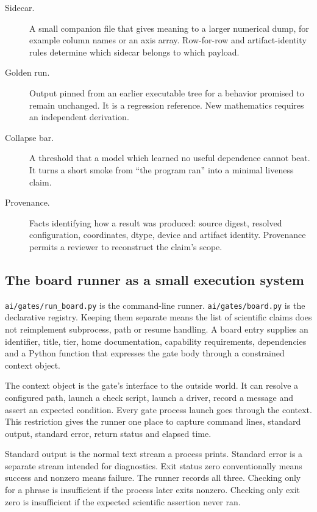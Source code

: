 \documentclass[10pt,aps,prd,twocolumn,nofootinbib]{revtex4-2}
\newcommand{\code}[1]{\texttt{#1}}
\begin{document}
\begin{description}
  \item[Sidecar.] A small companion file that gives meaning to a larger
  numerical dump, for example column names or an axis array.  Row-for-row and
  artifact-identity rules determine which sidecar belongs to which payload.

  \item[Golden run.] Output pinned from an earlier executable tree for a
  behavior promised to remain unchanged.  It is a regression reference.  New
  mathematics requires an independent derivation.

  \item[Collapse bar.] A threshold that a model which learned no useful
  dependence cannot beat.  It turns a short smoke from ``the program ran''
  into a minimal liveness claim.

  \item[Provenance.] Facts identifying how a result was produced: source
  digest, resolved configuration, coordinates, dtype, device and artifact
  identity.  Provenance permits a reviewer to reconstruct the claim's scope.
\end{description}

\subsection{The board runner as a small execution system}

\code{ai/gates/run\_board.py} is the command-line runner.
\code{ai/gates/board.py} is the declarative registry.  Keeping them separate
means the list of scientific claims does not reimplement subprocess, path or
resume handling.  A board entry supplies an identifier, title, tier, home
documentation, capability requirements, dependencies and a Python function
that expresses the gate body through a constrained context object.

The context object is the gate's interface to the outside world.  It can
resolve a configured path, launch a check script, launch a driver, record a
message and assert an expected condition.  Every gate process launch goes
through the context.  This restriction gives the runner one place to
capture command lines, standard output, standard error, return status and
elapsed time.

Standard output is the normal text stream a process prints.  Standard error is
a separate stream intended for diagnostics.  Exit status zero conventionally
means success and nonzero means failure.  The runner records all three.
Checking only for a phrase is insufficient if the process later exits
nonzero.  Checking only exit zero is insufficient if the expected scientific
assertion never ran.
\end{document}
